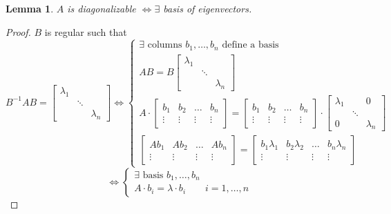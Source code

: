 \documentclass{article}
\newtheorem{lemma}{Lemma}  \numberwithin{lemma}{section}
\begin{document}
\begin{lemma} %
  $A$ is diagonalizable $\iff \exists$ basis of eigenvectors.
\end{lemma}

\begin{proof}
  $B$ is regular such that
  \[
    B^{-1} AB = \begin{bmatrix} \lambda_1 & & \\ & \ddots & \\ & & \lambda_n \end{bmatrix}
    \iff \begin{cases}
      \exists \text{ columns } b_{1}, \dots, b_n \text{ define a basis} \\
      AB = B \begin{bmatrix} \lambda_1 & & \\ & \ddots & \\ & & \lambda_n \end{bmatrix} \\
      A \cdot \begin{bmatrix} b_1 & b_2 & \dots & b_n \\ \vdots & \vdots & \vdots & \vdots \end{bmatrix} = \begin{bmatrix} b_1 & b_2 & \dots & b_n \\ \vdots & \vdots & \vdots & \vdots \end{bmatrix} \cdot \begin{bmatrix} \lambda_1 &  & 0 \\ & \ddots & \\ 0 & & \lambda_n \end{bmatrix} \\
      \begin{bmatrix} Ab_1 & Ab_2 & \dots & Ab_n \\ \vdots & \vdots & \vdots & \vdots \end{bmatrix} = \begin{bmatrix} b_1 \lambda_1 & b_2 \lambda_2 & \dots & b_n \lambda_n \\ \vdots & \vdots & \vdots & \vdots \end{bmatrix}
    \end{cases}
  \] \[
    \iff \begin{cases}
      \exists \text{ basis } b_1, \dots, b_n \\
      A \cdot b_i = \lambda \cdot b_i \qquad i = 1, \dots, n
    \end{cases}
  \]
\end{proof}
\end{document}
